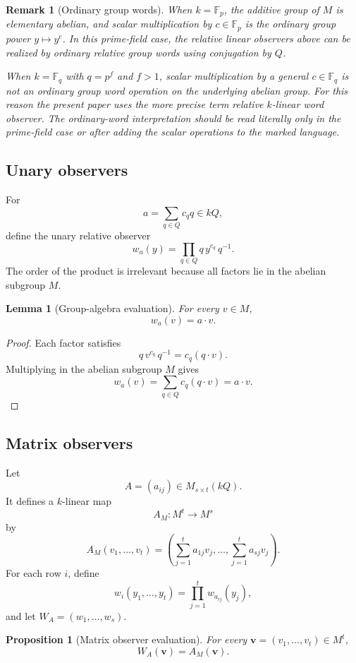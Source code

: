 \documentclass[11pt]{article}
\newtheorem{proposition}[theorem]{Proposition}
\newtheorem{lemma}[theorem]{Lemma}
\newtheorem{remark}[theorem]{Remark}
\begin{document}
\begin{remark}[Ordinary group words]
When $k=\mathbb F_p$, the additive group of $M$ is elementary abelian, and scalar multiplication by $c\in\mathbb F_p$ is the ordinary group power $y\mapsto y^c$. In this prime-field case, the relative linear observers above can be realized by ordinary relative group words using conjugation by $Q$.

When $k=\mathbb F_q$ with $q=p^f$ and $f>1$, scalar multiplication by a general $c\in\mathbb F_q$ is not an ordinary group word operation on the underlying abelian group. For this reason the present paper uses the more precise term relative $k$-linear word observer. The ordinary-word interpretation should be read literally only in the prime-field case or after adding the scalar operations to the marked language.
\end{remark}

\subsection{Unary observers}

For
\[
a=\sum_{q\in Q}c_q q\in kQ,
\]
define the unary relative observer
\[
w_a(y)=\prod_{q\in Q}q\, y^{c_q}\,q^{-1}.
\]
The order of the product is irrelevant because all factors lie in the abelian subgroup $M$.

\begin{lemma}[Group-algebra evaluation]
For every $v\in M$,
\[
w_a(v)=a\cdot v.
\]
\end{lemma}

\begin{proof}
Each factor satisfies
\[
q\,v^{c_q}\,q^{-1}=c_q(q\cdot v).
\]
Multiplying in the abelian subgroup $M$ gives
\[
w_a(v)=\sum_{q\in Q}c_q(q\cdot v)=a\cdot v.
\]
\end{proof}

\subsection{Matrix observers}

Let
\[
A=(a_{ij})\in M_{s\times t}(kQ).
\]
It defines a $k$-linear map
\[
A_M:M^t\to M^s
\]
by
\[
A_M(v_1,\ldots,v_t)
=
\left(
\sum_{j=1}^t a_{1j}v_j,\ldots,
\sum_{j=1}^t a_{sj}v_j
\right).
\]
For each row $i$, define
\[
w_i(y_1,\ldots,y_t)=\prod_{j=1}^t w_{a_{ij}}(y_j),
\]
and let $W_A=(w_1,\ldots,w_s)$.

\begin{proposition}[Matrix observer evaluation]
For every $\mathbf v=(v_1,\ldots,v_t)\in M^t$,
\[
W_A(\mathbf v)=A_M(\mathbf v).
\]
\end{proposition}
\end{document}
